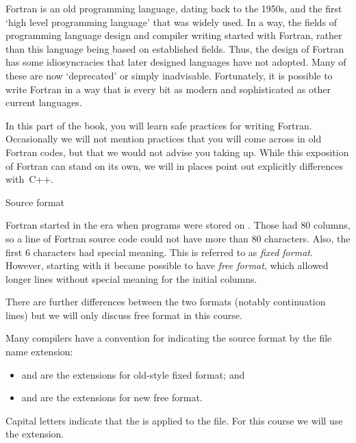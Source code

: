 
Fortran is an old programming language, dating back to the 1950s, and
the first `high level programming language' that was widely used.
In a way, the fields of programming language design and compiler
writing started with Fortran, rather than this language being based on
established fields. Thus, the design of Fortran has some
idiosyncracies that later designed languages have not adopted. Many of
these are now `deprecated' or simply inadvisable. Fortunately, it is
possible to write Fortran in a way that is every bit as modern and
sophisticated as other current languages.

In this part of the book, you will learn safe practices for
writing Fortran. Occasionally we will not mention practices that you
will come across in old Fortran codes, but that we would not advise
you taking up. While this exposition of Fortran can stand on its own,
we will in places point out explicitly differences with~C++.

 {Source format}

Fortran started in the era when programs were stored on
. Those had 80 columns, so a line of Fortran
source code could not have more than 80 characters. Also, the first 6
characters had special meaning. This is referred to as \emph{fixed
  format}. However, starting with
 it became possible to have \emph{free
  format}, which allowed longer lines
without special meaning for the initial columns.

There are further differences between the two formats (notably
continuation lines) but we will only discuss free format in this course.

Many compilers have a convention for indicating the source format by
the file name extension:
\begin{itemize}
\item {} and  are the extensions for old-style fixed format;
  and
\item {} and  are the extensions for new free format.
\end{itemize}
Capital letters indicate that the 
is applied to the file.
For this course we will use the  extension.

